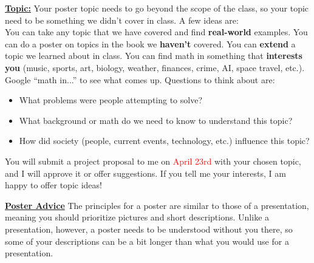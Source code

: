 \documentclass[12pt]{article}
\begin{document}
\textbf{\underline{Topic:}}
Your poster topic needs to go beyond the scope of the class, so your topic need to be something we didn't cover in class.  A few ideas are: \\ You can take any topic that we have covered and find \textbf{real-world} examples. You can do a poster on topics in the book we \textbf{haven't} covered. You can \textbf{extend} a topic we learned about in class.  You can find math in something that \textbf{interests you} (music, sports, art, biology, weather, finances, crime, AI, space travel, etc.). Google ``math in...'' to see what comes up. Questions to think about are:
\begin{itemize}
    \item What problems were people attempting to solve?
    \item What background or math do we need to know to understand this topic?
    \item How did society (people, current events, technology, etc.) influence this topic?
\end{itemize}

You will submit a project proposal to me on \textcolor{red}{April 23rd} with your chosen topic, and I will approve it or offer suggestions. If you tell me your interests, I am happy to offer topic ideas!\par

\textbf{\underline{Poster Advice}}
The principles for a poster are similar to those of a presentation, meaning you should prioritize pictures and short descriptions. Unlike a presentation, however, a poster needs to be understood without you there, so some of your descriptions can be a bit longer than what you would use for a presentation.
\end{document}
